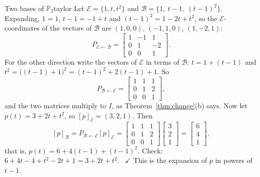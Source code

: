 \documentclass[11pt]{article}
\begin{document}
\begin{exmp}{Two bases of $\mathbb{P}_2$}{taylor}
Let $\mathcal{E}=\{1,t,t^2\}$ and $\mathcal{B}=\{1,\ t-1,\ (t-1)^2\}$. Expanding, $1=1$, $t-1=-1+t$ and $(t-1)^2=1-2t+t^2$, so the $\mathcal{E}$-coordinates of the vectors of $\mathcal{B}$ are $(1,0,0)$, $(-1,1,0)$, $(1,-2,1)$:
\[
P_{\mathcal{E}\leftarrow\mathcal{B}}=\begin{bmatrix}1&-1&1\\0&1&-2\\0&0&1\end{bmatrix}.
\]
For the other direction write the vectors of $\mathcal{E}$ in terms of $\mathcal{B}$: $t=1+(t-1)$ and $t^2=\bigl((t-1)+1\bigr)^2=(t-1)^2+2(t-1)+1$. So
\[
P_{\mathcal{B}\leftarrow\mathcal{E}}=\begin{bmatrix}1&1&1\\0&1&2\\0&0&1\end{bmatrix},
\]
and the two matrices multiply to $I$, as Theorem~\ref{thm:change}(b) says. Now let $p(t)=3+2t+t^2$, so $[p]_{\mathcal{E}}=(3,2,1)$. Then
\[
[p]_{\mathcal{B}}=P_{\mathcal{B}\leftarrow\mathcal{E}}[p]_{\mathcal{E}}=\begin{bmatrix}1&1&1\\0&1&2\\0&0&1\end{bmatrix}\begin{bmatrix}3\\2\\1\end{bmatrix}=\begin{bmatrix}6\\4\\1\end{bmatrix},
\]
that is, $p(t)=6+4(t-1)+(t-1)^2$. Check: $6+4t-4+t^2-2t+1=3+2t+t^2$. \ $\checkmark$ This is the expansion of $p$ in powers of $t-1$.
\end{exmp}

\begin{center}
\end{center}
\end{document}
